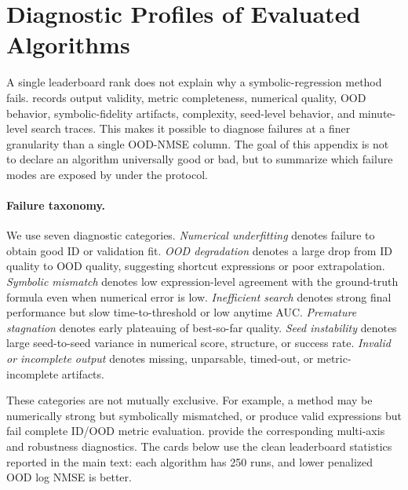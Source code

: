 \section{Diagnostic Profiles of Evaluated Algorithms}
\label{app:algorithm-diagnostics}

A single leaderboard rank does not explain why a symbolic-regression method fails. \arena{} records output validity, metric completeness, numerical quality, OOD behavior, symbolic-fidelity artifacts, complexity, seed-level behavior, and minute-level search traces. This makes it possible to diagnose failures at a finer granularity than a single OOD-NMSE column. The goal of this appendix is not to declare an algorithm universally good or bad, but to summarize which failure modes are exposed by \core{} under the \arena{} protocol.

\paragraph{Failure taxonomy.}
We use seven diagnostic categories. \emph{Numerical underfitting} denotes failure to obtain good ID or validation fit. \emph{OOD degradation} denotes a large drop from ID quality to OOD quality, suggesting shortcut expressions or poor extrapolation. \emph{Symbolic mismatch} denotes low expression-level agreement with the ground-truth formula even when numerical error is low. \emph{Inefficient search} denotes strong final performance but slow time-to-threshold or low anytime AUC. \emph{Premature stagnation} denotes early plateauing of best-so-far quality. \emph{Seed instability} denotes large seed-to-seed variance in numerical score, structure, or success rate. \emph{Invalid or incomplete output} denotes missing, unparsable, timed-out, or metric-incomplete artifacts.

These categories are not mutually exclusive. For example, a method may be numerically strong but symbolically mismatched, or produce valid expressions but fail complete ID/OOD metric evaluation.  provide the corresponding multi-axis and robustness diagnostics. The cards below use the clean \core{} leaderboard statistics reported in the main text: each algorithm has 250 runs, and lower penalized OOD log NMSE is better.

